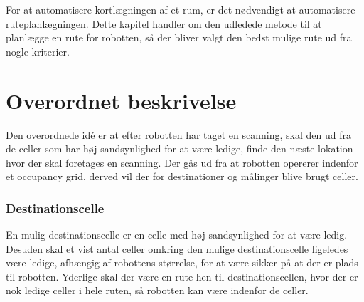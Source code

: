 
\newcommand{\unkcell}[3][]{\node (robot) [draw,fill=yellow, text centered, rectangle,
minimum height=\cellsize cm,minimum width=\cellsize cm, align=right] at ($(#2*\cellsize,#3*\cellsize) + (\cellsize/2,\cellsize/2)$) {$\scriptstyle #1$};}

\newcommand{\emptycell}[3][]{\node (robot) [draw,fill=green, text centered, rectangle,
minimum height=\cellsize cm,minimum width=\cellsize cm, align=right] at ($(#2*\cellsize,#3*\cellsize) + (\cellsize/2,\cellsize/2)$) {$\scriptstyle #1$};}

\newcommand{\occcell}[3][]{\node (robot) [draw,fill=red, text centered, rectangle,
minimum height=\cellsize cm,minimum width=\cellsize cm, align=right] at ($(#2*\cellsize,#3*\cellsize) + (\cellsize/2,\cellsize/2)$) {$\scriptstyle #1$};}

\newcommand{\scancell}[3][]{\node (robot) [draw,fill=orange, text centered, rectangle,
minimum height=\cellsize cm,minimum width=\cellsize cm, align=right] at ($(#2*\cellsize,#3*\cellsize) + (\cellsize/2,\cellsize/2)$) {$\scriptstyle #1$};}

\newcommand{\destcell}[3][]{\node (robot) [draw,fill=blue, text centered, rectangle,
minimum height=\cellsize cm,minimum width=\cellsize cm, align=right] at ($(#2*\cellsize,#3*\cellsize) + (\cellsize/2,\cellsize/2)$) {$\scriptstyle #1$};}

For at automatisere kortlægningen af et rum, er det nødvendigt at automatisere ruteplanlægningen.
Dette kapitel handler om den udledede metode til at planlægge en rute for robotten, så der bliver valgt den bedst mulige rute ud fra nogle kriterier.

\section{Overordnet beskrivelse}
Den overordnede idé er at efter robotten har taget en scanning, skal den ud fra de celler som har høj sandsynlighed for at være ledige, finde den næste lokation hvor der skal foretages en scanning.
Der gås ud fra at robotten opererer indenfor et occupancy grid, derved vil der for destinationer og målinger blive brugt celler.

\subsubsection{Destinationscelle}\label{rute:destinationscelle}
En mulig destinationscelle er en celle med høj sandsynlighed for at være ledig.
Desuden skal et vist antal celler omkring den mulige destinationscelle ligeledes være ledige, afhængig af robottens størrelse, for at være sikker på at der er plads til robotten.
Yderlige skal der være en rute hen til destinationscellen, hvor der er nok ledige celler i hele ruten, så robotten kan være indenfor de celler.


